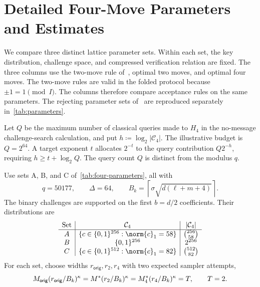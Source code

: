 \section{Detailed Four-Move Parameters and Estimates}
\label{app:four-comparison}

We compare three distinct lattice parameter sets. Within each set, the key distribution, challenge space, and compressed verification relation are fixed. The three columns use the two-move rule of~\cite{GartnerFull}, optimal two moves, and optimal four moves. The two-move rules are valid in the folded protocol because $\pm1=1\pmod I$. The columns therefore compare acceptance rules on the same parameters. The rejecting parameter sets of~\cite{GartnerFull} are reproduced separately in~\cref{tab:parameters}.

\begin{definition}
\label{def:query-budget}
Let $Q$ be the maximum number of classical queries made to $H_4$ in the no-message challenge-search calculation, and put $h\coloneqq\log_2|\mathcal C_4|$. The illustrative budget is $Q=2^{64}$. A target exponent $t$ allocates $2^{-t}$ to the query contribution $Q2^{-h}$, requiring $h\ge t+\log_2Q$. The query count $Q$ is distinct from the modulus $q$.
\end{definition}

\begin{definition}
\label{def:four-parameters}
Use sets A, B, and C of~\cref{tab:four-parameters}, all with
\[
 q=50177,\qquad \Delta=64,\qquad
 B_k=\left\lceil\sigma\sqrt{d(\ell+m+4)}\right\rceil.
\]
The binary challenges are supported on the first $b=d/2$ coefficients. Their distributions are
\begin{equation}
\label{eq:four-weight}
 \begin{array}{c|c|c}
 \text{Set}&\mathcal C_4&|\mathcal C_4|\\ \hline
 A&\{c\in\{0,1\}^{256}:\norm{c}_1=58\}&\binom{256}{58}\\
 B&\{0,1\}^{256}&2^{256}\\
 C&\{c\in\{0,1\}^{512}:\norm{c}_1=82\}&\binom{512}{82}
 \end{array}
\end{equation}
For each set, choose widths $r_{\mathsf{orig}},r_2,r_4$ with two expected sampler attempts,
\begin{equation}
\label{eq:four-matched}
 M_{\mathsf{orig}}(r_{\mathsf{orig}}/B_k)^\kappa
 =M^*(r_2/B_k)^\kappa
 =M_4^*(r_4/B_k)^\kappa=T,\qquad T=2.
\end{equation}
\end{definition}


